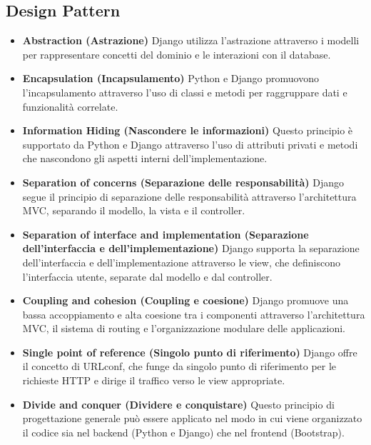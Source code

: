 \subsection{Design Pattern}

\begin{itemize}
    \item \textbf{Abstraction (Astrazione)}
    Django utilizza l'astrazione attraverso i modelli per rappresentare concetti del dominio e le interazioni con il database.
    \item \textbf{Encapsulation (Incapsulamento)}
    Python e Django promuovono l'incapsulamento attraverso l'uso di classi e metodi per raggruppare dati e funzionalità correlate.
    \item \textbf{Information Hiding (Nascondere le informazioni)}
    Questo principio è supportato da Python e Django attraverso l'uso di attributi privati e metodi che nascondono gli aspetti interni dell'implementazione.
    \item \textbf{Separation of concerns (Separazione delle responsabilità)}
    Django segue il principio di separazione delle responsabilità attraverso l'architettura MVC, separando il modello, la vista e il controller.
    \item \textbf{Separation of interface and implementation (Separazione dell'interfaccia e dell'implementazione)} 
    Django supporta la separazione dell'interfaccia e dell'implementazione attraverso le view, che definiscono l'interfaccia utente, separate dal modello e dal controller.
    \item \textbf{Coupling and cohesion (Coupling e coesione)}
    Django promuove una bassa accoppiamento e alta coesione tra i componenti attraverso l'architettura MVC, il sistema di routing e l'organizzazione modulare delle applicazioni.
    \item \textbf{Single point of reference (Singolo punto di riferimento)}
    Django offre il concetto di URLconf, che funge da singolo punto di riferimento per le richieste HTTP e dirige il traffico verso le view appropriate.
    \item \textbf{Divide and conquer (Dividere e conquistare)}
    Questo principio di progettazione generale può essere applicato nel modo in cui viene organizzato il codice sia nel backend (Python e Django) che nel frontend (Bootstrap).


\end{itemize}

